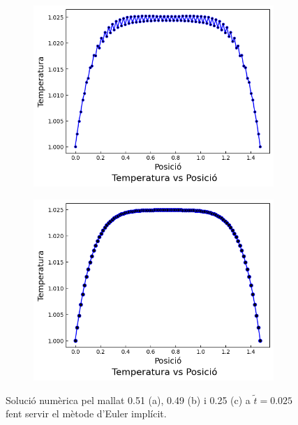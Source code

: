 \documentclass{article}
\begin{document}
\begin{figure}[h]
    \centering
    \begin{subfigure}[b]{0.35\textwidth}
        \includegraphics[width=\textwidth]{images/T_vs_z_at1.png} 
        \caption{}
        \label{fig:euler_imp_at1}
    \end{subfigure}
    \hspace{1.5cm}
    \begin{subfigure}[b]{0.35\textwidth}
        \includegraphics[width=\textwidth]{images/T_vs_z_at2.png}
        \caption{} 
        \label{fig:euler_imp_at2}
    \end{subfigure}
    \caption{Solució numèrica pel mallat 0.51 (a), 0.49 (b) i 0.25 (c) a $\tilde{t}=0.025$ fent servir el mètode d'Euler implícit.}
    \label{fig:euler_implicit}
\end{figure}
\end{document}
